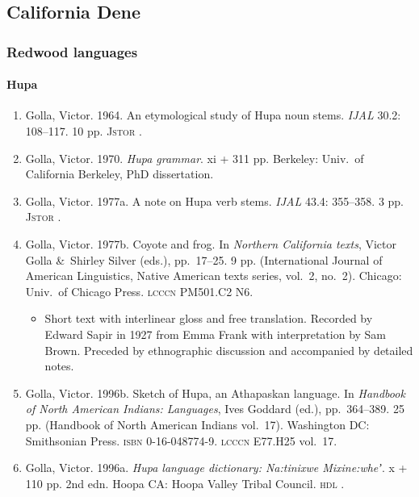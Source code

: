 \documentclass[12pt,letterpaper,oneside,article]{memoir}
\begin{document}
\subsection{California Dene}\label{sec:pacific-california}

\subsubsection{Redwood languages}\label{sec:pacific-california-redwood}

\paragraph{Hupa}\label{sec:hupa}

\begin{enumerate}
\item	Golla, Victor.
	1964.
	An etymological study of Hupa noun stems.
	\textit{IJAL} 30.2: 108–117.
	10 pp.
	\textsc{Jstor} .
\item	Golla, Victor.
	1970.
	\textit{Hupa grammar}.
	xi + 311 pp.
	Berkeley: Univ.\ of California Berkeley, PhD dissertation.
\item	Golla, Victor.
	1977a.
	A note on Hupa verb stems.
	\textit{IJAL} 43.4: 355–358.
	3 pp.
	\textsc{Jstor} .
\item	Golla, Victor.
	1977b.
	Coyote and frog.
	In \textit{Northern California texts}, Victor Golla \&\ Shirley Silver (eds.),
	pp.\ 17–25.
	9 pp.
	(International Journal of American Linguistics, Native American texts series, vol.\ 2,
		no.\ 2).
	Chicago: Univ.\ of Chicago Press.
	\textsc{lcccn} PM501.C2 N6.
	\begin{itemize}
	\item	Short text with interlinear gloss and free translation.
		Recorded by Edward Sapir in 1927 from Emma Frank with interpretation by
		Sam Brown.
		Preceded by ethnographic discussion and accompanied by detailed notes.
	\end{itemize}
\item	Golla, Victor.
	1996b.
	Sketch of Hupa, an Athapaskan language.
	In \textit{Handbook of North American Indians: Languages},
	Ives Goddard (ed.),
	pp.\ 364–389.
	25 pp.
	(Handbook of North American Indians vol.\ 17).
	Washington DC: Smithsonian Press.
	\textsc{isbn} 0-16-048774-9.
	\textsc{lcccn} E77.H25 vol.\ 17.
\item	Golla, Victor.
	1996a.
	\textit{Hupa language dictionary: Na:tinixwe Mixine:wheʼ}.
	x + 110 pp.
	2nd edn.
	Hoopa CA: Hoopa Valley Tribal Council.
	\textsc{hdl} .
\end{enumerate}
\end{document}
